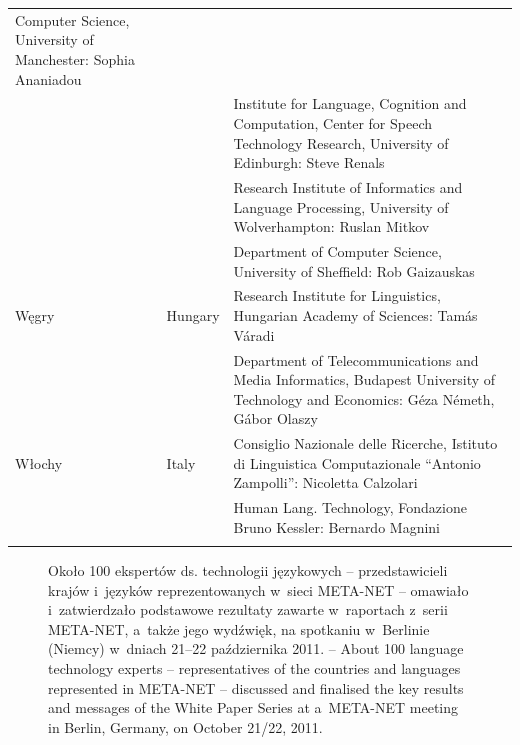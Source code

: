 \begin{longtable}{llp{115mm}}
Computer Science, University of Manchester: Sophia Ananiadou\\
\addlinespace & & Institute for Language, Cognition and Computation,
Center for Speech Technology Research, University of Edinburgh: Steve
Renals\\
\addlinespace & & Research Institute of Informatics and Language
Processing, University of Wolverhampton: Ruslan Mitkov\\
\addlinespace && Department of Computer Science, University of
Sheffield: Rob Gaizauskas\\
\addlinespace Węgry & \textcolor{grey1}{Hungary} & Research Institute
for Linguistics, Hungarian Academy of Sciences: Tamás Váradi\\
\addlinespace & & Department of Telecommunications and Media
Informatics, Budapest University of Technology and Economics: Géza
Németh, Gábor Olaszy\\
\addlinespace Włochy & \textcolor{grey1}{Italy} & Consiglio Nazionale
delle Ricerche, Istituto di Linguistica Computazionale \newline
“Antonio Zampolli”: Nicoletta Calzolari\\
\addlinespace & & Human Lang. Technology, Fondazione Bruno Kessler:
Bernardo Magnini\\
\addlinespace \end{longtable} \normalsize 

\renewcommand*{\figureformat}{} \renewcommand*{\captionformat}{} 

\begin{figure}[htb]  \center
  \caption{Około 100 ekspertów ds. technologii językowych --
przedstawicieli krajów i~języków reprezentowanych w~sieci META-NET
-- omawiało i~zatwierdzało podstawowe rezultaty zawarte w~raportach
z~serii META-NET, a~także jego wydźwięk, na spotkaniu w~Berlinie
(Niemcy) w~dniach 21--22 października 2011. --
  \textcolor{grey1}{About 100 language technology experts --
representatives of the countries and languages represented in META-NET
-- discussed and finalised the key results and messages of the White
Paper Series at a~META-NET meeting in Berlin, Germany, on October
21/22, 2011.}} \medskip {}
\end{figure} 

\cleardoublepage 

{} \label{whitepaperseries} 

